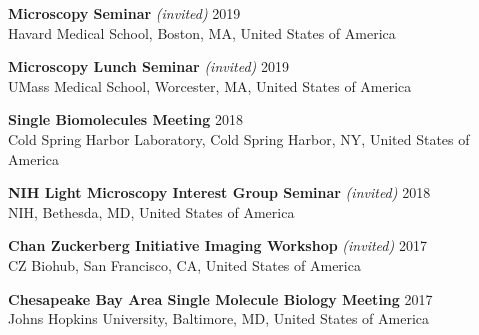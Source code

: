 \documentclass[margin,line]{res}
\begin{document}
\begin{resume}
\vspace*{-2.5mm}
{\bf  Microscopy Seminar} {\it (invited)} \hfill 2019\\
Havard Medical School, Boston, MA, United States of America%

\vspace*{-2.5mm}
{\bf Microscopy Lunch Seminar} {\it (invited)}  \hfill 2019\\
UMass Medical School, Worcester, MA, United States of America%

\vspace*{-2.5mm}
{\bf Single Biomolecules Meeting}   \hfill 2018\\
Cold Spring Harbor Laboratory, Cold Spring Harbor, NY, United States of America %

\vspace*{-2.5mm}
{\bf NIH Light Microscopy Interest Group Seminar} {\it (invited)}   \hfill 2018\\
 NIH, Bethesda, MD, United States of America %

\vspace*{-2.5mm}
{\bf Chan Zuckerberg Initiative Imaging Workshop} {\it (invited)}  \hfill 2017\\
 CZ Biohub, San Francisco, CA, United States of America%

\vspace*{-2.5mm}
{\bf Chesapeake Bay Area Single Molecule Biology Meeting} \hfill 2017\\
Johns Hopkins University, Baltimore, MD, United States of America%


\end{resume}
\end{document}

